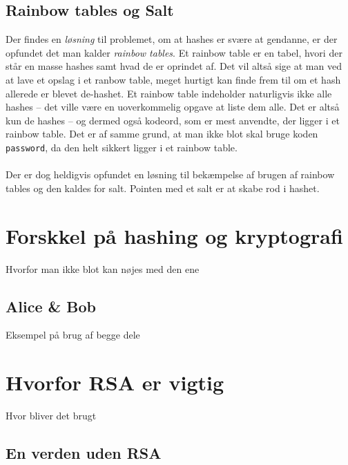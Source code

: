 \documentclass[a4paper, 12pt]{article}
\begin{document}
    \subsection{Rainbow tables og Salt}
    Der findes en \textit{løsning} til problemet, om at hashes er svære at gendanne, er der opfundet det man kalder \emph{rainbow tables}.
    Et rainbow table er en tabel, hvori der står en masse hashes samt hvad de er oprindet af.
    Det vil altså sige at man ved at lave et opslag i et ranbow table, meget hurtigt kan finde frem til om et hash allerede er blevet de-hashet.
    Et rainbow table indeholder naturligvis ikke alle hashes -- det ville være en uoverkommelig opgave at liste dem alle.
    Det er altså kun de hashes -- og dermed også kodeord, som er mest anvendte, der ligger i et rainbow table.
    Det er af samme grund, at man ikke blot skal bruge koden \texttt{password}, da den helt sikkert ligger i et rainbow table.
    \\
    \\
    Der er dog heldigvis opfundet en løsning til bekæmpelse af brugen af rainbow tables og den kaldes for salt.
    Pointen med et salt er at skabe rod i hashet.







\newpage
\section{Forskkel på hashing og kryptografi}
Hvorfor man ikke blot kan nøjes med den ene

    \subsection{Alice \& Bob}
    Eksempel på brug af begge dele



\newpage
\section{Hvorfor RSA er vigtig}
Hvor bliver det brugt

    \subsection{En verden uden RSA}





\newpage
\printbibliography[heading=bibintoc, title={Litteratur}]
\end{document}
